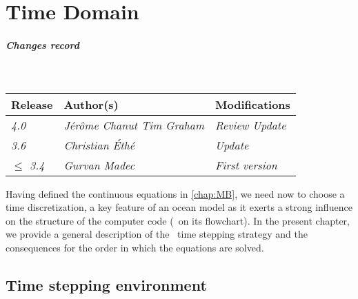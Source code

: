 \documentclass[../main/NEMO_manual]{subfiles}
\begin{document}
\chapter{Time Domain}
\label{chap:TD}

\thispagestyle{plain}

\chaptertoc

\paragraph{Changes record} ~\\

{\footnotesize
  \begin{tabularx}{0.5\textwidth}{l||X|X}
    Release          & Author(s)                                       &
    Modifications                                                      \\
    \hline
    {\em        4.0} & {\em J\'{e}r\^{o}me Chanut \newline Tim Graham} &
    {\em Review \newline Update                                      } \\
    {\em        3.6} & {\em Christian \'{E}th\'{e}                   } &
    {\em Update                                                      } \\
    {\em $\leq$ 3.4} & {\em Gurvan Madec                             } &
    {\em First version                                               } \\
  \end{tabularx}
}

\clearpage



Having defined the continuous equations in \autoref{chap:MB},
we need now to choose a time discretization,
a key feature of an ocean model as it exerts a strong influence on the structure of the computer code
(\ie\ on its flowchart).
In the present chapter, we provide a general description of the \NEMO\ time stepping strategy and
the consequences for the order in which the equations are solved.

\section{Time stepping environment}
\label{sec:TD_environment}
\end{document}

